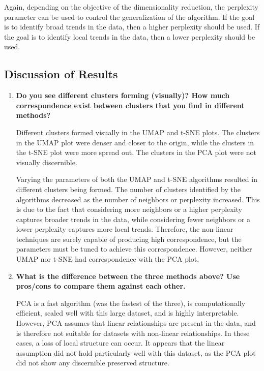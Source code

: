\documentclass[12pt]{article}
\begin{document}
Again, depending on the objective of the dimensionality reduction, the perplexity parameter can be used to control the generalization of the algorithm. If the goal is to identify broad trends in the data, then a higher perplexity should be used. If the goal is to identify local trends in the data, then a lower perplexity should be used.

\subsection{Discussion of Results}
\begin{enumerate}
    \item \textbf{Do you see different clusters forming (visually)? How much correspondence exist between clusters that you find in different methods?}

    Different clusters formed visually in the UMAP and t-SNE plots. The clusters in the UMAP plot were denser and closer to the origin, while the clusters in the t-SNE plot were more spread out. The clusters in the PCA plot were not visually discernible.  

    Varying the parameters of both the UMAP and t-SNE algorithms resulted in different clusters being formed. The number of clusters identified by the algorithms decreased as the number of neighbors or perplexity increased. This is due to the fact that considering more neighbors or a higher perplexity captures broader trends in the data, while considering fewer neighbors or a lower perplexity captures more local trends. Therefore, the non-linear techniques are surely capable of producing high correspondence, but the parameters must be tuned to achieve this correspondence. However, neither UMAP nor t-SNE had correspondence with the PCA plot.

    \item \textbf{What is the difference between the three methods above? Use pros/cons to compare them against each other.}
    
    PCA is a fast algorithm (was the fastest of the three), is computationally efficient, scaled well with this large dataset, and is highly interpretable. However, PCA assumes that linear relationships are present in the data, and is therefore not suitable for datasets with non-linear relationships. In these cases, a loss of local structure can occur. It appears that the linear assumption did not hold particularly well with this dataset, as the PCA plot did not show any discernible preserved structure.


\end{enumerate}
\end{document}
